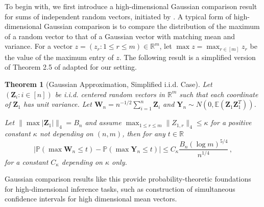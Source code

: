 \documentclass[11pt]{article}
\theoremstyle{plain}
\newtheorem{theorem}{Theorem}[section]
\begin{document}
To begin with, we first introduce a high-dimensional Gaussian comparison result for sums of independent random vectors, initiated by \cite{chernozhukov2013gaussian}.
A typical form of high-dimensional Gaussian comparison is to compare the distribution of the maximum of a random vector to that of a Gaussian vector with matching mean and variance.
For a vector $z=(z_r:1\le r\le m)\in\mathbb R^m$, let $\max z=\max_{r\in [m]}z_r$ be the value of the maximum entry of $z$.
The following result is a simplified version of Theorem 2.5 of \cite{chernozhukov2022improved} adapted for our setting.
\begin{theorem}[Gaussian Approximation, Simplified i.i.d. Case]\label{thm:4.3-cckk}
    Let $(\mathbf Z_i:i\in[n])$ be i.i.d. centered random vectors in $\mathbb R^m$ such that each coordinate of $\mathbf Z_1$ has unit variance.
    Let $\mathbf W_n=n^{-1/2}\sum_{i=1}^n \mathbf Z_i$ and $\mathbf{Y}_n\sim N(0,\mathbb E (\mathbf Z_1 \mathbf Z_1^T))$.

Let $\|\max|\mathbf Z_1|\|_4= B_n$ and assume
$\max_{1\le r\le m}\|Z_{1,r}\|_4\le \kappa$ for a positive constant $\kappa$ not depending on $(n,m)$, then for any $t\in\mathbb R$
\begin{equation}\label{eq:4.3-hd-gaussian}
\left|\mathbb P(\max \mathbf W_n \le t)-\mathbb P(\max \mathbf Y_n\le t)\right|\le C_{\kappa}\frac{B_n(\log m)^{5/4}}{n^{1/4}}\,,
\end{equation}
for a constant $C_\kappa$ depending on $\kappa$ only.
\end{theorem}

Gaussian comparison results like this provide probability-theoretic foundations for high-dimensional inference tasks, such as construction of simultaneous confidence intervals for high dimensional mean vectors.
\end{document}
